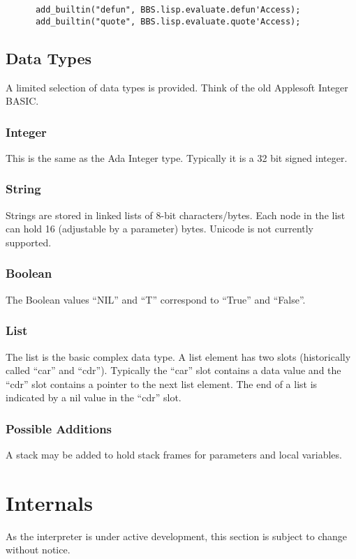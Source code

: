 \documentclass[10pt, openany]{book}
\begin{document}
\lstset{language=Ada}
\begin{lstlisting}
      add_builtin("defun", BBS.lisp.evaluate.defun'Access);
      add_builtin("quote", BBS.lisp.evaluate.quote'Access);
\end{lstlisting}

\section{Data Types}
A limited selection of data types is provided.  Think of the old Applesoft Integer BASIC.

\subsection{Integer}
This is the same as the Ada Integer type.  Typically it is a 32 bit signed integer.

\subsection{String}
Strings are stored in linked lists of 8-bit characters/bytes.  Each node in the list can hold 16 (adjustable by a parameter) bytes.  Unicode is not currently supported.

\subsection{Boolean}
The Boolean values ``NIL'' and ``T'' correspond to ``True'' and ``False''.

\subsection{List}
The list is the basic complex data type.  A list element has two slots (historically called ``car'' and ``cdr'').  Typically the ``car'' slot contains a data value and the ``cdr'' slot contains a pointer to the next list element.  The end of a list is indicated by a nil value in the ``cdr'' slot.

\subsection{Possible Additions}
A stack may be added to hold stack frames for parameters and local variables.

\chapter{Internals}
As the interpreter is under active development, this section is subject to change without notice.
\end{document}
